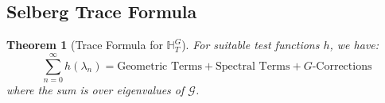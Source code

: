 \documentclass[11pt]{article}
\theoremstyle{plain}
\newtheorem{theorem}{Theorem}[section]
\theoremstyle{remark}
\newcommand{\H}{\mathbb{H}}
\newcommand{\cG}{\mathcal{G}}
\newcommand{\Catalan}{G}
\begin{document}
\subsection{Selberg Trace Formula}

\begin{theorem}[Trace Formula for $\H_T^{\Catalan}$]
For suitable test functions $h$, we have:
\[
\sum_{n=0}^\infty h(\lambda_n) = \text{Geometric Terms} + \text{Spectral Terms} + \Catalan\text{-Corrections}
\]
where the sum is over eigenvalues of $\cG$.
\end{theorem}
\end{document}
